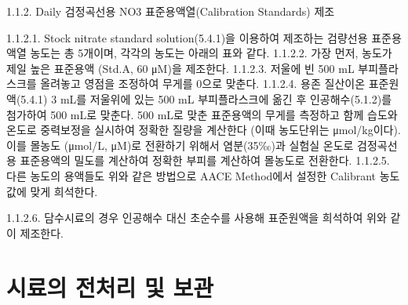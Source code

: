 \documentclass[
]{book}
\begin{document}
1.1.2. Daily 검정곡선용 NO3 표준용액열(Calibration Standards) 제조

1.1.2.1. Stock nitrate standard solution(5.4.1)을 이용하여 제조하는 검량선용 표준용액열 농도는 총 5개이며, 각각의 농도는 아래의 표와 같다.
1.1.2.2. 가장 먼저, 농도가 제일 높은 표준용액 (Std.A, 60 μM)을 제조한다.
1.1.2.3. 저울에 빈 500 mL 부피플라스크를 올려놓고 영점을 조정하여 무게를 0으로 맞춘다.
1.1.2.4. 용존 질산이온 표준원액(5.4.1) 3 mL를 저울위에 있는 500 mL 부피플라스크에 옮긴 후 인공해수(5.1.2)를 첨가하여 500 mL로 맞춘다. 500 mL로 맞춘 표준용액의 무게를 측정하고 함께 습도와 온도로 중력보정을 실시하여 정확한 질량을 계산한다 (이때 농도단위는 μmol/kg이다). 이를 몰농도 (μmol/L, μM)로 전환하기 위해서 염분(35‰)과 실험실 온도로 검정곡선용 표준용액의 밀도를 계산하여 정확한 부피를 계산하여 몰농도로 전환한다. 1.1.2.5. 다른 농도의 용액들도 위와 같은 방법으로 AACE Method에서 설정한 Calibrant 농도 값에 맞게 희석한다.

1.1.2.6. 담수시료의 경우 인공해수 대신 초순수를 사용해 표준원액을 희석하여 위와 같이 제조한다.

\hypertarget{uxc2dcuxb8ccuxc758-uxc804uxcc98uxb9ac-uxbc0f-uxbcf4uxad00-1}{%
\section{시료의 전처리 및 보관}\label{uxc2dcuxb8ccuxc758-uxc804uxcc98uxb9ac-uxbc0f-uxbcf4uxad00-1}}
\end{document}
